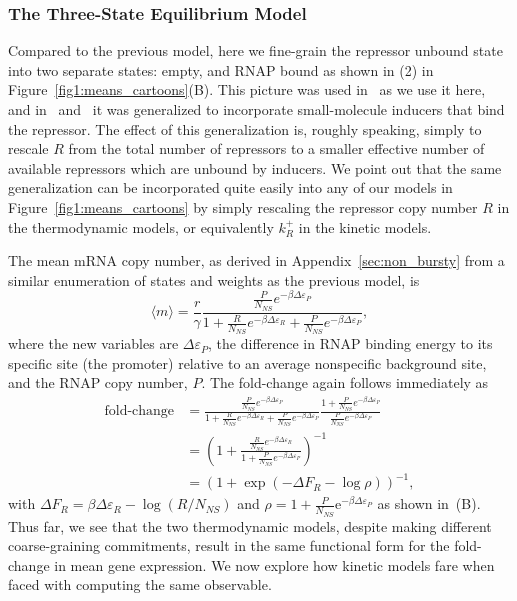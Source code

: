 \subsubsection{The Three-State Equilibrium Model}
Compared to the previous model, here we fine-grain the repressor unbound state
into two separate states: empty, and RNAP bound as shown in (2) in
Figure~\ref{fig1:means_cartoons}(B). This picture was used in~\cite{Garcia2011a}
as we use it here, and in~\cite{Razo-Mejia2018} and~\cite{Chure2019} it was
generalized to incorporate small-molecule inducers that bind the repressor. The
effect of this generalization is, roughly speaking, simply to rescale $R$ from
the total number of repressors to a smaller effective number of available
repressors which are unbound by inducers. We point out that the same
generalization can be incorporated quite easily into any of our models in
Figure~\ref{fig1:means_cartoons} by simply rescaling the repressor copy number
$R$ in the thermodynamic models, or equivalently $k_R^+$ in the kinetic models.

The mean mRNA copy number, as derived in Appendix~\ref{sec:non_bursty}
from a similar enumeration of states and weights as the previous model, is
\begin{equation}
\langle m \rangle = \frac{r}{\gamma}
\frac{\frac{P}{N_{NS}} e^{-\beta\Delta\varepsilon_P}}
        {
        1 + \frac{R}{N_{NS}} e^{-\beta\Delta\varepsilon_R}
        + \frac{P}{N_{NS}} e^{-\beta\Delta\varepsilon_P}
        },
\end{equation}
where the new variables are $\Delta\varepsilon_P$, the difference in RNAP
binding energy to its specific site (the promoter) relative to an average
nonspecific background site, and the RNAP copy number, $P$. The fold-change
again follows immediately as
\begin{align}
\text{fold-change}
&= \frac{\frac{P}{N_{NS}} e^{-\beta\Delta\varepsilon_P}}
        {
        1 + \frac{R}{N_{NS}} e^{-\beta\Delta\varepsilon_R}
        + \frac{P}{N_{NS}} e^{-\beta\Delta\varepsilon_P}
        }
\frac{1 + \frac{P}{N_{NS}} e^{-\beta\Delta\varepsilon_P}}
        {\frac{P}{N_{NS}} e^{-\beta\Delta\varepsilon_P}}
\\
&= \left(
1 + \frac{\frac{R}{N_{NS}} e^{-\beta\Delta\varepsilon_R}}
        {1 + \frac{P}{N_{NS}} e^{-\beta\Delta\varepsilon_P}}
\right)^{-1}
\\
&= (1 + \exp(-\Delta F_R - \log\rho))^{-1},
\end{align}
with $\Delta F_R = \beta\Delta\varepsilon_R - \log(R/N_{NS})$ and $\rho = 1 +
\frac{P}{N_{NS}}\mathrm{e}^{-\beta\Delta\varepsilon_P}$ as shown
in~(B). Thus far, we see that the two thermodynamic
models, despite making different coarse-graining commitments, result in the same
functional form for the fold-change in mean gene expression.  We now explore how
kinetic models fare when faced with computing the same observable.

